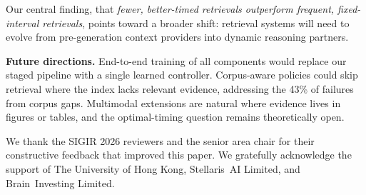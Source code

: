 \documentclass[sigconf,natbib=true]{acmart}
\begin{document}
Our central finding, that \emph{fewer, better-timed retrievals outperform frequent, fixed-interval retrievals}, points toward a broader shift: retrieval systems will need to evolve from pre-generation context providers into dynamic reasoning partners.

\textbf{Future directions.} End-to-end training of all components would replace our staged pipeline with a single learned controller. Corpus-aware policies could skip retrieval where the index lacks relevant evidence, addressing the 43\% of failures from corpus gaps. Multimodal extensions are natural where evidence lives in figures or tables, and the optimal-timing question remains theoretically open.

\begin{acks}
We thank the SIGIR 2026 reviewers and the senior area chair for their
constructive feedback that improved this paper. We gratefully
acknowledge the support of The University of Hong Kong, Stellaris~AI
Limited, and Brain~Investing Limited.
\end{acks}


\balance

\end{document}
